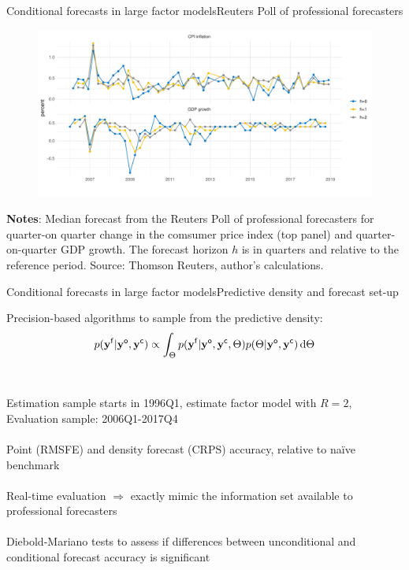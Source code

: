\documentclass[xcolor=svgnames, 10pt, aspectratio=169]{beamer}
\begin{document}
\begin{frame}{Conditional forecasts in large factor models}{Reuters Poll of professional forecasters}    

    \begin{figure}
        \includegraphics[scale = 0.45]{fig_ReutersPoll.pdf}
    \end{figure}
    \begin{adjustbox}{minipage=0.8\textwidth,center}
            {\tiny \textbf{Notes}: Median forecast from the Reuters Poll of professional forecasters for quarter-on quarter change in the comsumer price index (top panel) and quarter-on-quarter GDP growth. The forecast horizon $h$ is in quarters and relative to the reference period. Source: Thomson Reuters, author's calculations.}\par
    \end{adjustbox} 
\end{frame}


\begin{frame}{Conditional forecasts in large factor models}{Predictive density and forecast set-up}

    Precision-based algorithms to sample from the predictive density: 
    $$p(\mathbf{y^{\sf{f}}}|\mathbf{y^{\sf{o}}}, \mathbf{y^{\sf{c}}}) \propto \int_{\Theta} p(\mathbf{y^{\sf{f}}}|\mathbf{y^{\sf{o}}},\mathbf{y^{\sf{c}}}, \Theta) p(\Theta|\mathbf{y^{\sf{o}}}, \mathbf{y^{\sf{c}}})\, \text{d}\Theta$$ \\~\\

    Estimation sample starts in 1996Q1, estimate factor model with $R=2$, Evaluation sample: 2006Q1-2017Q4 \\~\\

    Point (RMSFE) and density forecast (CRPS) accuracy, relative to na\"ive benchmark \\~\\

    Real-time evaluation $\Longrightarrow$ exactly mimic the information set available to professional forecasters \\~\\

    Diebold-Mariano tests to assess if differences between unconditional and conditional forecast accuracy is significant
\end{frame}
\end{document}
